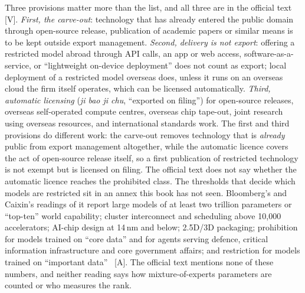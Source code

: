 Three provisions matter more than the list, and all three are in the official text [V]. \emph{First, the carve-out}: technology that has already entered the public domain through open-source release, publication of academic papers or similar means is to be kept outside export management. \emph{Second, delivery is not export}: offering a restricted model abroad through API calls, an app or web access, software-as-a-service, or ``lightweight on-device deployment'' does not count as export; local deployment of a restricted model overseas does, unless it runs on an overseas cloud the firm itself operates, which can be licensed automatically. \emph{Third, automatic licensing} (\emph{ji bao ji chu}, ``exported on filing'') for open-source releases, overseas self-operated compute centres, overseas chip tape-out, joint research using overseas resources, and international standards work. The first and third provisions do different work: the carve-out removes technology that is \emph{already} public from export management altogether, while the automatic licence covers the act of open-source release itself, so a first publication of restricted technology is not exempt but is licensed on filing. The official text does not say whether the automatic licence reaches the prohibited class. The thresholds that decide which models are restricted sit in an annex this book has not seen. Bloomberg's and Caixin's readings of it report large models of at least two trillion parameters or ``top-ten'' world capability; cluster interconnect and scheduling above 10{,}000 accelerators; AI-chip design at 14\,nm and below; 2.5D/3D packaging; prohibition for models trained on ``core data'' and for agents serving defence, critical information infrastructure and core government affairs; and restriction for models trained on ``important data''~\cite{gov-catalogue-thresholds} [A]. The official text mentions none of these numbers, and neither reading says how mixture-of-experts parameters are counted or who measures the rank.

